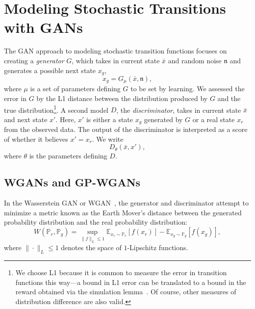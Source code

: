 \documentclass[letterpaper]{article} %
\begin{document}

\section{Modeling Stochastic Transitions with GANs}

The GAN approach to modeling stochastic transition functions focuses on creating a \textit{generator} $G$, which takes in current state $\bar{x}$ and random noise $\mathfrak{n}$ and generates a possible next state $x_g$,
\begin{equation}\label{g-model}
    x_g = G_{\mu}(\bar{x},\mathfrak{n}),
\end{equation}
where $\mu$ is a set of parameters defining $G$ to be set by learning. We assessed the error in $G$ by the L1 distance between the distribution produced by $G$ and the true distribution\footnote{We choose L1 because it is common to measure the error in transition functions this way---a bound in L1 error can be translated to a bound in the reward obtained via the simulation lemma~\cite{kearns02}. Of course, other measures of distribution difference are also valid.}.
A second model $D$, the \textit{discriminator}, takes in current state $\bar{x}$ and next state $x'$. Here, $x'$ is either a state $x_g$ generated by $G$ or a real state $x_r$ from the observed data. The output of the discriminator is interpreted as a score of whether it believes $x' = x_r$. We write
\begin{equation}\label{d-model}
    D_{\theta}(\bar{x},x'),
\end{equation}
where $\theta$ is the parameters defining $D$.

\subsection{WGANs and GP-WGANs}

In the Wasserstein GAN or WGAN~\cite{arjovsky2017wasserstein}, the generator and discriminator attempt to minimize a metric known as the Earth Mover's distance between the generated probability distribution and the real probability distribution:
\begin{equation}\label{eq:em-dst}
W(\mathbb{P}_r, \mathbb{P}_g) = \sup_{\|f\|_L \leq 1} \mathbb{E}_{x_r\sim \mathbb{P}_r}\left[ f(x_r) \right] - \mathbb{E}_{x_g\sim \mathbb{P}_g}\left[ f(x_g) \right],
\end{equation}
where $\| \cdot \|_L \leq 1$ denotes the space of $1$-Lipschitz functions. 
\end{document}
